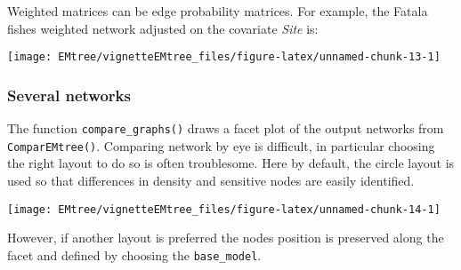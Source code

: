 Weighted matrices can be edge probability matrices. For example, the Fatala fishes weighted network adjusted on the covariate
\textit{Site} is:

\begin{Shaded}
\begin{Highlighting}[]
\NormalTok{probs[probs}\OperatorTok{<}\OperatorTok{/}\NormalTok{p]=} 
\NormalTok{, }\NormalTok{, }
\NormalTok{,}\NormalTok{)}\OperatorTok{\$}
\end{Highlighting}
\end{Shaded}

\begin{center}\texttt{[image: EMtree/vignetteEMtree\_files/figure-latex/unnamed-chunk-13-1]} \end{center}

\subsubsection{Several
networks}\label{facets-of-several-networks}

The function \texttt{compare\_graphs()} draws a facet plot of the output
networks from \texttt{ComparEMtree()}. Comparing network by eye is
difficult, in particular choosing the right layout to do so is often
troublesome. Here by default, the circle layout is used so that
differences in density and sensitive nodes are easily identified.

\begin{Shaded}
\begin{Highlighting}[]
\NormalTok{)}\OperatorTok{\$}
\end{Highlighting}
\end{Shaded}

\begin{center}\texttt{[image: EMtree/vignetteEMtree\_files/figure-latex/unnamed-chunk-14-1]} \end{center}

However, if another layout is preferred the nodes position is preserved
along the facet and defined by choosing the \texttt{base\_model}.

